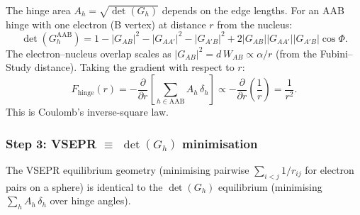 The hinge area $A_h = \sqrt{\det(G_h)}$ depends on the edge lengths.  For an AAB hinge with one electron (B vertex) at distance $r$ from the nucleus:
\begin{equation}
\det(G_h^{\text{AAB}}) = 1 - |G_{AB}|^2 - |G_{AA'}|^2 - |G_{A'B}|^2 + 2|G_{AB}||G_{AA'}||G_{A'B}|\cos\Phi.
\end{equation}
The electron--nucleus overlap scales as $|G_{AB}|^2 = d\,W_{AB} \propto \alpha/r$ (from the Fubini--Study distance).  Taking the gradient with respect to $r$:
\begin{equation}
F_\text{hinge}(r) = -\frac{\partial}{\partial r}\left[\sum_{h \in \text{AAB}} A_h\,\delta_h\right] \propto -\frac{\partial}{\partial r}\left(\frac{1}{r}\right) = \frac{1}{r^2}.
\end{equation}
This is Coulomb's inverse-square law.

\subsubsection{Step 3: VSEPR $\equiv$ $\det(G_h)$ minimisation}

\begin{theorem}
\label{thm:vsepr_equiv}
The VSEPR equilibrium geometry (minimising pairwise $\sum_{i < j} 1/r_{ij}$ for electron pairs on a sphere) is identical to the $\det(G_h)$ equilibrium (minimising $\sum_h A_h\,\delta_h$ over hinge angles).
\end{theorem}

